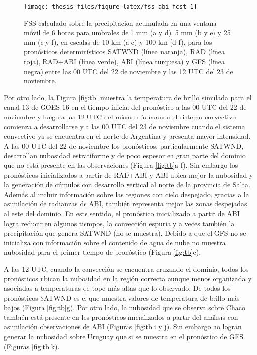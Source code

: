 \documentclass[12pt,oneside,a4paper]{reedthesis}
\begin{document}
\begin{figure}
\texttt{[image: thesis\_files/figure-latex/fss-abi-fcst-1]} \caption{FSS calculado sobre la precipitación acumulada en una ventana móvil de 6 horas para umbrales de 1 mm (a y d), 5 mm (b y e) y 25 mm (c y f), en escalas de 10 km (a-c) y 100 km (d-f), para los pronósticos determinísticos SATWND (línea naranja), RAD (línea roja), RAD+ABI (línea verde), ABI (línea turquesa) y GFS (línea negra) entre las 00 UTC del 22 de noviembre y las 12 UTC del 23 de noviembre.}\label{fig:fss-abi-fcst}
\end{figure}
Por otro lado, la Figura \ref{fig:tb} muestra la temperatura de brillo simulada para el canal 13 de GOES-16 en el tiempo inicial del pronóstico a las 00 UTC del 22 de noviembre y luego a las 12 UTC del mismo día cuando el sistema convectivo comienza a desarrollarse y a las 00 UTC del 23 de noviembre cuando el sistema convectivo ya se encuentra en el norte de Argentina y presenta mayor intensidad. A las 00 UTC del 22 de noviembre los pronósticos, particularmente SATWND, desarrollan nubosidad estratiforme y de poco espesor en gran parte del dominio que no está presente en las observaciones (Figura \ref{fig:tb}a-f). Sin embargo los pronósticos inicializados a partir de RAD+ABI y ABI ubica mejor la nubosidad y la generación de cúmulos con desarrollo vertical al norte de la provincia de Salta. Además al incluir información sobre las regiones con cielo despejado, gracias a la asimilación de radianzas de ABI, también representa mejor las zonas despejadas al este del dominio. En este sentido, el pronóstico inicializado a partir de ABI logra reducir en algunos tiempos, la convección espuria y a veces también la precipitación que genera SATWND (no se muestra). Debido a que el GFS no se inicializa con información sobre el contenido de agua de nube no muestra nubosidad para el primer tiempo de pronóstico (Figura \ref{fig:tb}e).

A las 12 UTC, cuando la convección se encuentra cruzando el dominio, todos los pronósticos ubican la nubosidad en la región correcta aunque menos organizada y asociadas a temperaturas de tope más altas que lo observado. De todos los pronósticos SATWND es el que muestra valores de temperatura de brillo más bajos (Figura \ref{fig:tb}g). Por otro lado, la nubosidad que se observa sobre Chaco también está presente en los pronósticos inicializados a partir del análisis con asimilación observaciones de ABI (Figuras \ref{fig:tb}i y j). Sin embargo no logran generar la nubosidad sobre Uruguay que si se muestra en el pronóstico de GFS (Figuras \ref{fig:tb}k).
\end{document}
